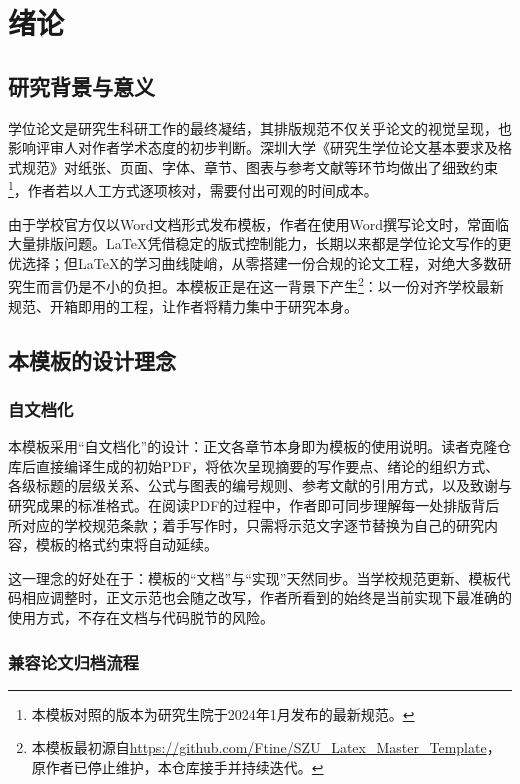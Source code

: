 \clearpage

\section{绪论}

\subsection{研究背景与意义}

学位论文是研究生科研工作的最终凝结，其排版规范不仅关乎论文的视觉呈现，也影响评审人对作者学术态度的初步判断。深圳大学《研究生学位论文基本要求及格式规范》对纸张、页面、字体、章节、图表与参考文献等环节均做出了细致约束\footnote{本模板对照的版本为研究生院于2024年1月发布的最新规范。}，作者若以人工方式逐项核对，需要付出可观的时间成本。

由于学校官方仅以Word文档形式发布模板，作者在使用Word撰写论文时，常面临大量排版问题。LaTeX凭借稳定的版式控制能力，长期以来都是学位论文写作的更优选择；但LaTeX的学习曲线陡峭，从零搭建一份合规的论文工程，对绝大多数研究生而言仍是不小的负担。本模板正是在这一背景下产生\footnote{本模板最初源自\url{https://github.com/Ftine/SZU_Latex_Master_Template}，原作者已停止维护，本仓库接手并持续迭代。}：以一份对齐学校最新规范、开箱即用的工程，让作者将精力集中于研究本身。

\subsection{本模板的设计理念}

\subsubsection{自文档化}

本模板采用“自文档化”的设计：正文各章节本身即为模板的使用说明。读者克隆仓库后直接编译生成的初始PDF，将依次呈现摘要的写作要点、绪论的组织方式、各级标题的层级关系、公式与图表的编号规则、参考文献的引用方式，以及致谢与研究成果的标准格式。在阅读PDF的过程中，作者即可同步理解每一处排版背后所对应的学校规范条款；着手写作时，只需将示范文字逐节替换为自己的研究内容，模板的格式约束将自动延续。

这一理念的好处在于：模板的“文档”与“实现”天然同步。当学校规范更新、模板代码相应调整时，正文示范也会随之改写，作者所看到的始终是当前实现下最准确的使用方式，不存在文档与代码脱节的风险。

\subsubsection{兼容论文归档流程}

